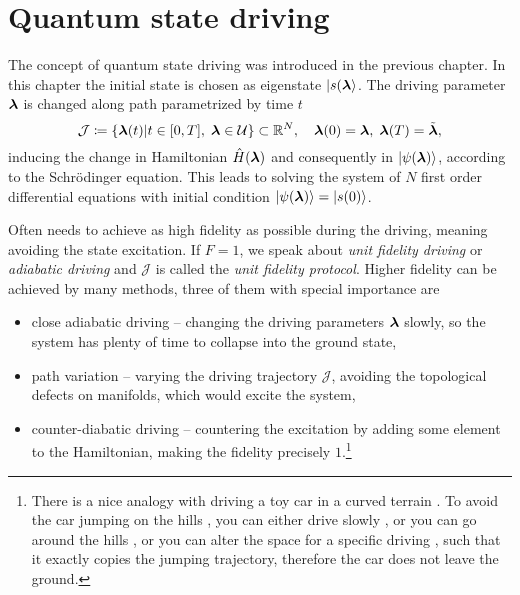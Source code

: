 \chapter{Quantum state driving}
\label{chap:typesOfDriving}
The concept of quantum state driving was introduced in the previous chapter. In this chapter the initial state is chosen as eigenstate $\ket{s({\bm\lambda}}$. The driving parameter ${\bm\lambda}$ is changed along path parametrized by time $t$
\begin{equation}
    \mathcal J\coloneqq\{{\bm\lambda}(t)|t\in[0,T],\; {\bm\lambda}\in \mathcal U\} \subset \mathbb{R}^N,\quad {\bm\lambda}(0)={\bm\lambda},\; {\bm\lambda}(T)=\tilde{{\bm\lambda}},
    \label{eq:defJ_QSdriving}
\end{equation}
inducing the change in Hamiltonian $\hat{H}({\bm\lambda})$ and consequently in $\ket{\psi({\bm\lambda})}$, according to the Schr\"odinger equation. This leads to solving the system of $N$ first order differential equations with initial condition $\ket{\psi({\bm\lambda})}=\ket{s(0)}$.

Often needs to achieve as high fidelity as possible during the driving, meaning avoiding the state excitation. If $F=1$, we speak about \emph{unit fidelity driving} or \emph{adiabatic driving} and $\mathcal J$ is called the \emph{unit fidelity protocol}. Higher fidelity can be achieved by many methods, three of them with special importance are
\begin{itemize}
    \item close adiabatic driving -- changing the driving parameters ${\bm\lambda}$ slowly, so the system has plenty of time to collapse into the ground state,
    \item path variation -- varying the driving trajectory $\mathcal J$, avoiding the topological defects on manifolds, which would excite the system,
    \item counter-diabatic driving -- countering the excitation by adding some element to the Hamiltonian, making the fidelity precisely $1$.\footnote{There is a nice analogy with driving a toy car  in a curved terrain . To avoid the car jumping on the hills , you can either drive slowly , or you can go around the hills , or you can alter the space for a specific driving , such that it exactly copies the jumping trajectory, therefore the car does not leave the ground.}
\end{itemize}

